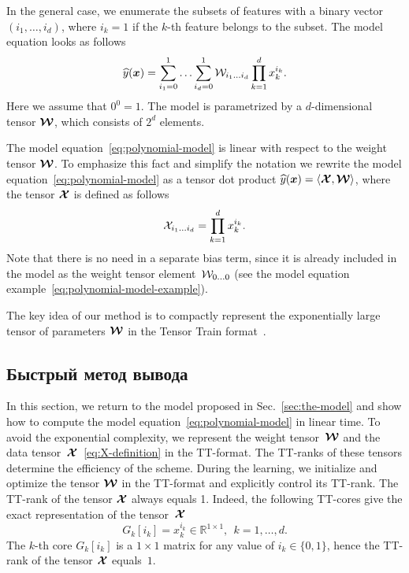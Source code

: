 In the general case, we enumerate the subsets of features with a binary vector $(i_1, \ldots, i_d)$, where $i_k = 1$ if the $k$-th feature belongs to the subset. The model equation looks as follows
\begin{equation}
\label{eq:polynomial-model}
\widehat{y}(\boldsymbol{x}) = \sum_{i_1=0}^1 \ldots \sum_{i_d=0}^1 \mathcal{W}_{i_1 \ldots i_d} \prod_{k=1}^d x_k^{i_k}.
\end{equation}
Here we assume that $0^0 = 1$.
The model is parametrized by a $d$-dimensional tensor $\boldsymbol{\mathcal{W}}$, which consists of $2^d$ elements.

The model equation~\eqref{eq:polynomial-model} is linear with respect to the weight tensor $\boldsymbol{\mathcal{W}}$.
To emphasize this fact and simplify the notation we rewrite the model equation~\eqref{eq:polynomial-model} as a tensor dot product $\widehat{y}(\boldsymbol{x}) = \langle \boldsymbol{\mathcal{X}}, \boldsymbol{\mathcal{W}} \rangle$, where the tensor $\boldsymbol{\mathcal{X}}$ is defined as follows
\begin{equation}
\label{eq:X-definition}
\mathcal{X}_{i_1 \ldots i_d} = \prod_{k=1}^d x_k^{i_k}.
\end{equation}
Note that there is no need in a separate bias term, since it is already included in the model as the weight tensor element~$\mathcal{W}_{0 \ldots 0}$ (see the model equation example~\eqref{eq:polynomial-model-example}).

The key idea of our method is to compactly represent the exponentially large tensor of parameters $\boldsymbol{\mathcal{W}}$ in the Tensor Train format~\cite{oseledets2011ttMain}.

\subsection{Быстрый метод вывода}
In this section, we return to the model proposed in Sec.~\ref{sec:the-model} and show how to compute the model equation~\eqref{eq:polynomial-model} in linear time.
To avoid the exponential complexity, we represent the weight tensor~$\boldsymbol{\mathcal{W}}$ and the data tensor~$\boldsymbol{\mathcal{X}}$~\eqref{eq:X-definition} in the TT-format.
The TT-ranks of these tensors determine the efficiency of the scheme.
During the learning, we initialize and optimize the tensor $\boldsymbol{\mathcal{W}}$ in the TT-format and explicitly control its TT-rank.
The TT-rank of the tensor $\boldsymbol{\mathcal{X}}$ always equals 1. Indeed, the following TT-cores give the exact representation of the tensor~$\boldsymbol{\mathcal{X}}$
\begin{equation*}
G_k[i_k] = x_k^{i_k} \in \mathbb{R}^{1 \times 1}, ~~ k=1, \ldots, d.
\end{equation*}
The $k$-th core $G_k[i_k]$ is a $1 \times 1$ matrix for any value of $i_k \in \{0, 1\}$, hence the TT-rank of the tensor $\boldsymbol{\mathcal{X}}$ equals~$1$.

